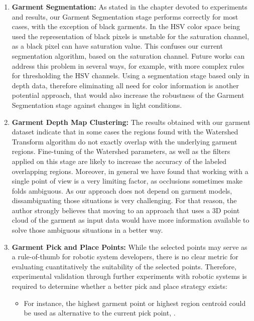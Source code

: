 \begin{enumerate}
	\item \textbf{Garment Segmentation:} As stated in the chapter devoted to experiments and results, our  Garment Segmentation stage performs correctly for most cases, with the exception of black garments. In the HSV color space being used the representation of black pixels is unstable for the saturation channel, as a black pixel can have saturation value. This confuses our current segmentation algorithm, based on the saturation channel. Future works can address this problem in several ways, for example, with more complex rules for thresholding the HSV channels. Using a segmentation stage based only in depth data, therefore eliminating all need for color information is another potential approach, that would also increase the robustness of the Garment Segmentation stage against changes in light conditions.
	
	\item \textbf{Garment Depth Map Clustering:} The results obtained with our garment dataset indicate that in some cases the regions found with the Watershed Transform algorithm do not exactly overlap with the underlying garment regions. Fine-tuning of the Watershed parameters, as well as the filters applied on this stage are likely to increase the accuracy of the labeled overlapping regions. Moreover, in general we have found that working with a single point of view is a very limiting factor, as occlusions sometimes make folds ambiguous. As our approach does not depend on garment models, dissambiguating those situations is very challenging. For that reason, the author strongly believes that moving to an approach that uses a 3D point cloud of the garment as input data would have more information available to solve those ambiguous situations in a better way.

	\item \textbf{Garment Pick and Place Points:} While the selected points may serve as a rule-of-thumb for robotic system developers, there is no clear metric for evaluating cuantitatively the suitability of the selected points. Therefore, experimental validation through further experiments with robotic systems is required to determine whether a better pick and place strategy exists:
	
\begin{itemize}
\item For instance, the highest garment point or highest region centroid could be used as alternative to the current pick point, .


\end{itemize}
\end{enumerate}
